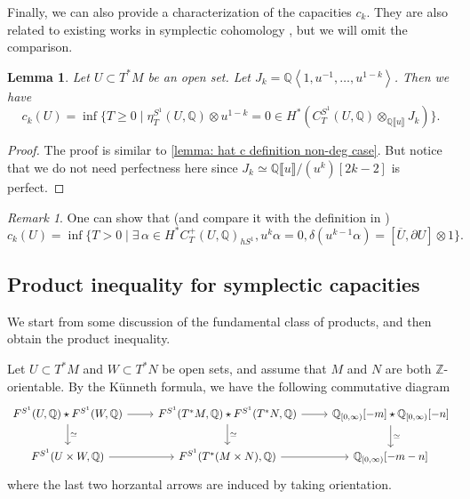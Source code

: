 \documentclass[11pt]{amsart}
\numberwithin{equation}{section}
\theoremstyle{plain}
\newtheorem{Lemma}[lemma]{Lemma}
\theoremstyle{definition}
\theoremstyle{remark}
\newtheorem{RMK}[rmk]{Remark}
\newcommand{\bQ} { {\mathbb{Q}}}
\newcommand{\bZ} { {\mathbb{Z}}}
\newcommand{\fpw}[1]{{\llbracket #1\rrbracket}}
\begin{document}
Finally, we can also provide a characterization of the capacities $c_k$. They are also related to existing works in symplectic cohomology \cite{Zhou2022kdilations}, but we will omit the comparison.

\begin{Lemma}\label{lemma: c definition non-deg case }Let $U\subset T^*M$ be an open set.
Let $J_k = \bQ\left<1,u^{-1},\dots,u^{1-k}\right>$. Then we have 
\[{c}_k(U)=\inf\{T\geq 0\mid \eta_T^{S^1}(U,\bQ)\otimes u^{1-k}=0\in H^*(C_{T}^{S^1} (U,\bQ)\otimes_{\bQ\fpw{u}} J_k)\}.\]
\end{Lemma}
\begin{proof}The proof is similar to \autoref{lemma: hat c definition non-deg case}. But notice that  we do not need perfectness here since $J_k\simeq \bQ\fpw{u}/(u^k)[2k-2]$ is perfect.
\end{proof}





\begin{RMK}
One can show that (and compare it with the definition in \cite[Definition 3.4]{Zhou2022kdilations})
\[c_k(U) = \inf\{T > 0 \mid \exists\,\alpha \in H^*C^+_T(U,\bQ)_{hS^1}, u^k\alpha = 0, \delta(u^{k-1}\alpha) = [\overline{U},\partial U] \otimes 1\}.\]
\end{RMK}



\subsection{Product inequality for symplectic capacities}\label{section: product inequality}
We start from some discussion of the fundamental class of products, and then obtain the product inequality.

Let $U\subset T^*M$ and $W\subset T^*N$ be open sets, and assume that $M$ and $N$ are both $\bZ$-orientable. By the Künneth formula, we have the following commutative diagram
\[
\begin{tikzcd}
{F^{S^1}(U,\bQ)\star F^{S^1}(W,\bQ)} \arrow[d, "\simeq"] \arrow[r] & {F^{S^1}(T^*M,\bQ)\star F^{S^1}(T^*N,\bQ)} \arrow[d, "\simeq"] \arrow[r] & {\bQ_{[0,\infty)}[-m]\star\bQ_{[0,\infty)}[-n]} \arrow[d, "\simeq"] \\
{F^{S^1}(U\times W,\bQ)} \arrow[r]                           & {F^{S^1}(T^*(M\times N),\bQ)} \arrow[r]                            & {\bQ_{[0,\infty)}[-m-n]}                                           
\end{tikzcd}
\]
where the last two horzantal arrows are induced by taking orientation.
\end{document}
